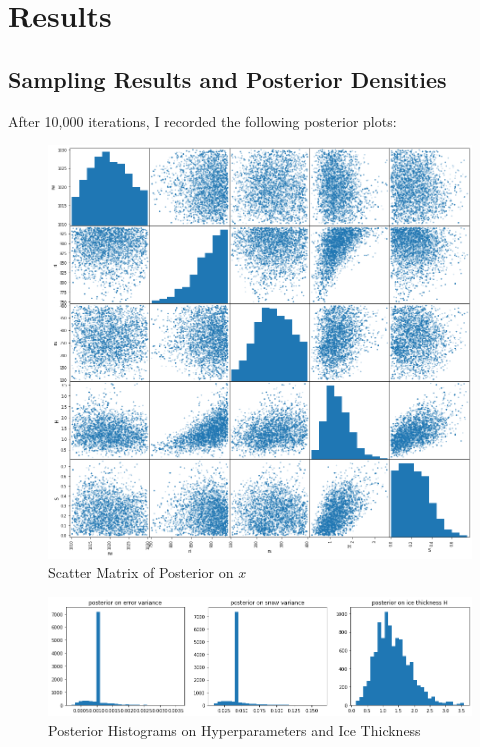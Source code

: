 \documentclass[12pt, letterpaper]{article}
\begin{document}
\newpage
\section{Results}

\subsection{Sampling Results and Posterior Densities}
After 10,000 iterations, I recorded the following posterior plots:
\begin{figure}[h]
\caption{Scatter Matrix of Posterior on $x$}
\includegraphics[width=\textwidth]{posterior_matrix.png}
\end{figure}

\begin{figure}[h]
\caption{Posterior Histograms on Hyperparameters and Ice Thickness}
\includegraphics[width=\textwidth]{posteriors.png}
\end{figure}
\end{document}
